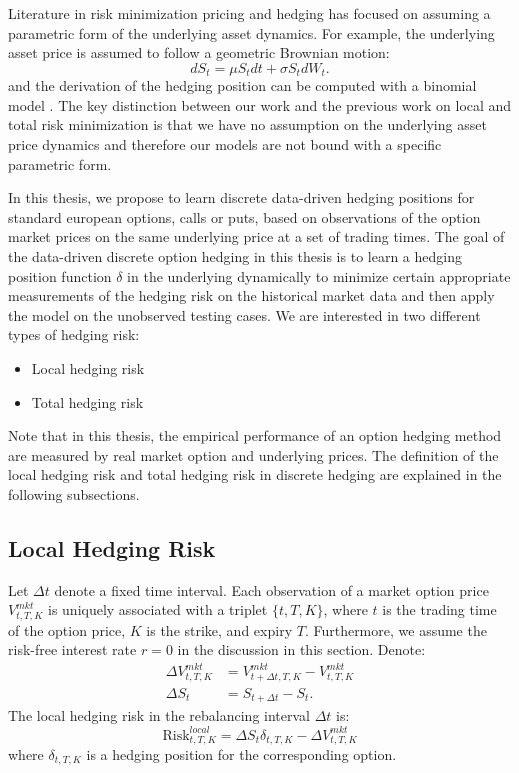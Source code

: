 \documentclass[letterpaper,12pt,titlepage,oneside,final]{book}
\numberwithin{equation}{section}
\theoremstyle{definition}
\newcommand{\DT}{\Delta t}
\newcommand{\Vmkt}{V^{mkt}}
\newcommand{\Smkt}{S}
\begin{document}
Literature in risk minimization pricing and hedging has focused on assuming a parametric form of the underlying asset dynamics. For example, the underlying asset price is assumed to follow  a geometric Brownian motion:
\[
dS_t=\mu S_t dt+\sigma S_t dW_t.
\]
and the derivation of the hedging position  can be computed with a binomial model \cite{coleman2003discrete,coleman2007discrete}. The key distinction between our work and  the previous work on local and total risk minimization is that we have no assumption on the underlying asset price dynamics and therefore our models are not bound with a specific parametric form.

In this thesis, we propose to learn discrete data-driven hedging positions for standard european options, calls or puts, based on observations of the option market prices on the same underlying price at a set of trading times. The goal of the data-driven discrete option hedging in this thesis is to learn a hedging position function $\delta$ in the underlying dynamically to minimize certain appropriate measurements of the hedging risk on the historical market data and then apply the model on the unobserved testing cases. We are interested in two different types of hedging risk:
\begin{itemize}
   \item  Local hedging risk
   \item  Total hedging risk
\end{itemize}
Note that in this thesis, the  empirical performance of an option hedging method are measured by real market option and underlying prices.
The definition of the  local hedging risk and  total hedging risk in discrete hedging are explained in the following subsections. 

\subsection{Local Hedging Risk}
\label{sec:DiscreteLocalRisk}
 Let $\DT$ denote a fixed  time interval.
Each observation of a market option price  $V^{mkt}_{t,T,K}$ is uniquely associated with a triplet $\{t,T,K\}$, where $t$ is the trading time of the option price,  $K$ is the strike, and expiry $T$. Furthermore, we assume the risk-free interest rate $r=0$ in the discussion in this section. Denote:
\begin{equation}
\begin{split}
\Delta V^{mkt}_{t,T,K}& =\Vmkt_{t+\Delta t,T,K}-\Vmkt_{t,T,K}\\
\Delta \Smkt_{t} &=\Smkt_{t+\DT}-\Smkt_{t}.
\end{split}
\label{eq:DVDS}
\end{equation}
The  local hedging risk in the rebalancing interval $\DT$ is:
\begin{equation}
	\text{Risk}^{local}_{t,T,K}=\Delta \Smkt_{t}\delta_{t,T,K} -\Delta V^{mkt}_{t,T,K}
\label{eq:local}
\end{equation}
where $\delta_{t,T,K}$ is a hedging position for the corresponding option.
\end{document}
